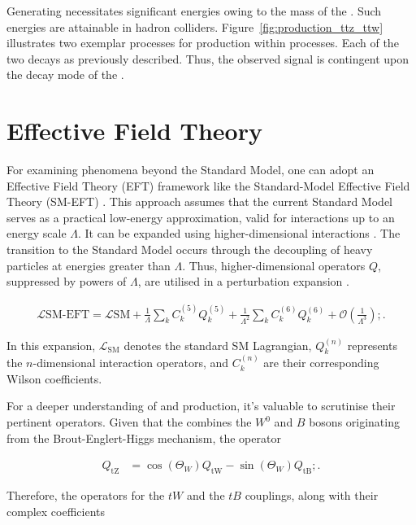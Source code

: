 \documentclass[bachelor,ngerman,english]{GAUBM}
\begin{document}
Generating \tquarks necessitates significant energies owing to the mass of the \tquark. Such energies are attainable in hadron colliders. Figure~\ref{fig:production_ttz_ttw} illustrates two exemplar processes for \tquark production within \ttbar processes. Each of the two \tquarks decays as previously described. Thus, the observed signal is contingent upon the decay mode of the \wboson.


\section{Effective Field Theory}
\label{sec:theory_eft}
For examining phenomena beyond the Standard Model, one can adopt an Effective Field Theory (EFT) framework like the Standard-Model Effective Field Theory (SM-EFT) \cite{eft_operatorlist}. This approach assumes that the current Standard Model serves as a practical low-energy approximation, valid for interactions up to an energy scale $\Lambda$. It can be expanded using higher-dimensional interactions \cite{eft_introduction}. The transition to the Standard Model occurs through the decoupling of heavy particles at energies greater than $\Lambda$. Thus, higher-dimensional operators $Q$, suppressed by powers of $\Lambda$, are utilised in a perturbation expansion \cite{eft_introduction}.

\begin{align}
\mathcal{L}\text{SM-EFT} = \mathcal{L}\text{SM} + \frac{1}{\Lambda}\sum_{k}C_k^{(5)}Q_k^{(5)} + \frac{1}{\Lambda^2}\sum_{k}C_k^{(6)}Q_k^{(6)} + \mathcal{O}\left(\frac{1}{\Lambda^3}\right);.\label{eq:SM-EFT}
\end{align}

In this expansion, $\mathcal{L}_\text{SM}$ denotes the standard SM Lagrangian, $Q_k^{(n)}$ represents the $n$-dimensional interaction operators, and $C_k^{(n)}$ are their corresponding Wilson coefficients.

For a deeper understanding of \ttbarZ and \ttbarW production, it's valuable to scrutinise their pertinent operators. Given that the \zboson combines the $W^0$ and $B$ bosons originating from the Brout-Englert-Higgs mechanism, the operator %

\begin{align}
Q_\text{tZ} &= \cos(\Theta_W)Q_\text{tW} - \sin(\Theta_W)Q_\text{tB};.\label{eq:OparatortZ}
\end{align}

Therefore, the operators for the $tW$ and the $tB$ couplings, along with their complex coefficients %
\end{document}
